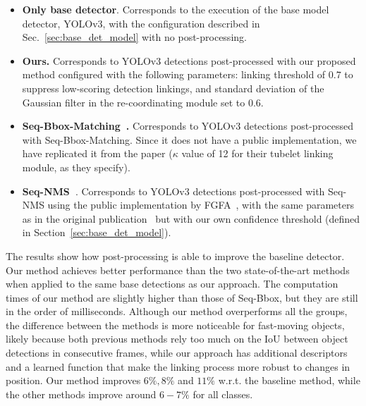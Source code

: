 \documentclass[letterpaper, 10 pt, conference]{ieeeconf}
\begin{document}
\begin{itemize}















\item{\textbf{Only base detector}.} Corresponds to the execution of the base model detector, YOLOv3, with the configuration described in Sec.~\ref{sec:base_det_model} with no post-processing.
\item{\textbf{Ours.}} Corresponds to YOLOv3 detections post-processed with our proposed method configured with the following parameters: linking threshold of $0.7$ to suppress low-scoring detection linkings, and standard deviation of the Gaussian filter in the re-coordinating module set to $0.6$.
\item{\textbf{Seq-Bbox-Matching~\cite{SEQ-BBOX:VISIGRAPP}.}} Corresponds to YOLOv3 detections post-processed with Seq-Bbox-Matching. Since it does not have a public implementation, we have replicated it from the paper (\(\kappa\) value of 12 for their tubelet linking module, as they specify).
\item{\textbf{Seq-NMS~\cite{SEQ-NMS}}.} Corresponds to YOLOv3 detections post-processed with Seq-NMS using the public implementation by FGFA~\cite{Zhu_2017_ICCV}, with the same parameters as in the original publication~\cite{SEQ-NMS} but with our own confidence threshold (defined in Section~\ref{sec:base_det_model}). 

\end{itemize}








\noindent The results show how post-processing is able to improve the baseline detector. Our method achieves better performance than the two state-of-the-art methods when applied to the same base detections as our approach. The computation times of our method are slightly higher than those of Seq-Bbox, but they are still in the order of milliseconds. 
Although our method overperforms all the groups, the difference between the methods is more noticeable for fast-moving objects, likely because both previous methods rely too much on the IoU between object detections in consecutive frames, while our approach has additional descriptors and a learned function that make the linking process more robust to changes in position. Our method improves $6\%, 8\%$ and $11\%$ w.r.t. the baseline method, while the other methods improve around $6-7\%$ for all classes. 
\end{document}
